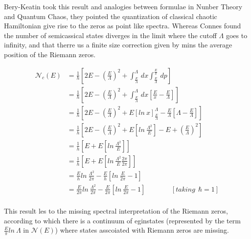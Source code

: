 \documentclass[12pt, letterpaper]{article}
\newcommand*{\1}{\hspace{1pt}}
\begin{document}
    Bery-Keatin took this result and analogies between formulae in Nunber Theory and Quantum Chaos, they pointed the quantization of classical chaotic Hamiltonian give
    rise to the zeros as point like spectra.\cite{s1,s4} Whereas Connes found the number of semicassical states diverges in the limit where the cutoff $\Lambda$ goes to
    infinity, and that therre us a finite size correction given by mins the average position of the Riemann zeros.

    \begin{equation}
        \begin{split}
            \mathcal {N}_{c} (E) &= \frac{1}{h}\left[ 2E - \left(\frac{E}{\Lambda} \right)^{2} + \int_{\frac{E}{\Lambda}}^{\Lambda}  \,dx\int^{\frac{E}{x}}_{\frac{E}{\Lambda}}  \,dp   \right] \\ 
             & = \frac{1}{h}\left[ 2E - \left(\frac{E}{\Lambda} \right)^{2} + \int_{\frac{E}{\Lambda}}^{\Lambda}  \,dx\left[\frac{E}{x} - \frac{E}{\Lambda}\right]   \right] \\ 
             & = \frac{1}{h}\left[ 2E - \left(\frac{E}{\Lambda} \right)^{2} + E\left[ln \ x\right] _{\frac{E}{\Lambda}}^{\Lambda} - \frac{E}{\Lambda}\left[\Lambda - \frac{E}{\Lambda}\right]   \right] \\ 
             & = \frac{1}{h}\left[ 2E - \left(\frac{E}{\Lambda} \right)^{2} + E\left[ln \ \frac{\Lambda ^{2}}{E}\right] - E + \left(\frac{E}{\Lambda}\right)^{2}\right]  \\ 
             & = \frac{1}{h}\left[ E  + E\left[ln \ \frac{\Lambda ^{2}}{E}\right] \right]  \\ 
             & = \frac{1}{h}\left[ E  + E\left[ln \ \frac{\Lambda ^{2}}{E}\frac{2\pi}{2\pi}\right] \right]  \\ 
             & = \frac{E}{h} ln \ \frac{\Lambda ^{2}}{2\pi} - \frac{E}{h} \left[ln \ \frac{E}{2\pi} - 1\right]  \\
             & = \frac{E}{2\pi} ln \ \frac{\Lambda ^{2}}{2\pi} - \frac{E}{2\pi} \left[ln \ \frac{E}{2\pi} - 1\right] \ \ \ \ \ \ \ \ \ \ \ \ \ \ \ \ \   [taking \ \ \hbar=1] \\
        \end{split} 
    \end{equation}

    This result les to the missing spectral interpretation of the Riemann zeros, according to which there is a continuum of eginstates (represented by the term $\frac{E}{\pi}
     ln \ \Lambda$ in $\mathcal {N} (E)$) where states asscoiated with Riemann zeros are missing.
\end{document}
